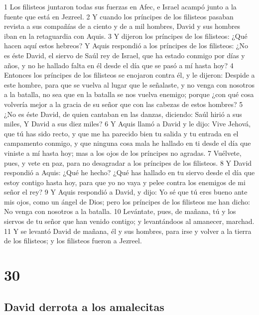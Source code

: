 {1 Los filisteos juntaron todas sus fuerzas en Afec, e Israel acampó junto a la fuente que está en Jezreel.
2 Y cuando los príncipes de los filisteos pasaban revista a sus compañías de a ciento y de a mil hombres, David y sus hombres iban en la retaguardia con Aquis.
3 Y dijeron los príncipes de los filisteos: ¿Qué hacen aquí estos hebreos? Y Aquis respondió a los príncipes de los filisteos: ¿No es éste David, el siervo de Saúl rey de Israel, que ha estado conmigo por días y años, y no he hallado falta en él desde el día que se pasó a mí hasta hoy?
4 Entonces los príncipes de los filisteos se enojaron contra él, y le dijeron: Despide a este hombre, para que se vuelva al lugar que le señalaste, y no venga con nosotros a la batalla, no sea que en la batalla se nos vuelva enemigo; porque ¿con qué cosa volvería mejor a la gracia de su señor que con las cabezas de estos hombres?
5 ¿No es éste David, de quien cantaban en las danzas, diciendo:
Saúl hirió a sus miles,
Y David a sus diez miles?
6 Y Aquis llamó a David y le dijo: Vive Jehová, que tú has sido recto, y que me ha parecido bien tu salida y tu entrada en el campamento conmigo, y que ninguna cosa mala he hallado en ti desde el día que viniste a mí hasta hoy; mas a los ojos de los príncipes no agradas.
7 Vuélvete, pues, y vete en paz, para no desagradar a los príncipes de los filisteos.
8 Y David respondió a Aquis: ¿Qué he hecho? ¿Qué has hallado en tu siervo desde el día que estoy contigo hasta hoy, para que yo no vaya y pelee contra los enemigos de mi señor el rey?
9 Y Aquis respondió a David, y dijo: Yo sé que tú eres bueno ante mis ojos, como un ángel de Dios; pero los príncipes de los filisteos me han dicho: No venga con nosotros a la batalla.
10 Levántate, pues, de mañana, tú y los siervos de tu señor que han venido contigo; y levantándoos al amanecer, marchad.
11 Y se levantó David de mañana, él y sus hombres, para irse y volver a la tierra de los filisteos; y los filisteos fueron a Jezreel.

\chapter{30}

\section*{David derrota a los amalecitas}

}
